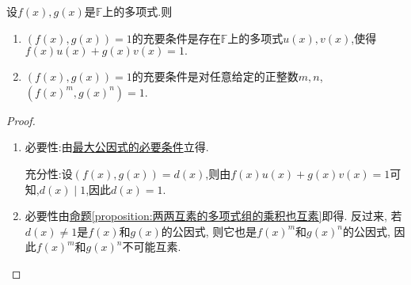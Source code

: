 \documentclass[../../main.tex]{subfiles}
\begin{document}
\begin{theorem}[多项式互素的充要条件]\label{theorem:多项式互素的充要条件}
设\(f(x),g(x)\)是\(\mathbb{F}\)上的多项式.则
\begin{enumerate}[(1)]
\item \((f(x),g(x)) = 1\)的充要条件是存在\(\mathbb{F}\)上的多项式\(u(x),v(x)\),使得$f(x)u(x)+g(x)v(x)=1.$
\item \((f(x),g(x)) = 1\)的充要条件是对任意给定的正整数\(m,n\), \((f(x)^m,g(x)^n)=1\).
\end{enumerate}
\end{theorem}
\begin{proof}
\begin{enumerate}
\item 必要性:由\hyperref[theorem:最大公因式的必要条件]{最大公因式的必要条件}立得.

充分性:设$(f(x),g(x))=d(x)$,则由$f(x)u(x)+g(x)v(x)=1$可知,$d(x)\mid 1$,因此$d(x)=1.$

\item 必要性由\hyperref[proposition:两两互素的多项式组的乘积也互素]{命题\ref{proposition:两两互素的多项式组的乘积也互素}}即得. 反过来, 若\(d(x)\neq 1\)是\(f(x)\)和\(g(x)\)的公因式, 则它也是\(f(x)^m\)和\(g(x)^n\)的公因式, 因此\(f(x)^m\)和\(g(x)^n\)不可能互素.
\end{enumerate}
\end{proof}
\end{document}
